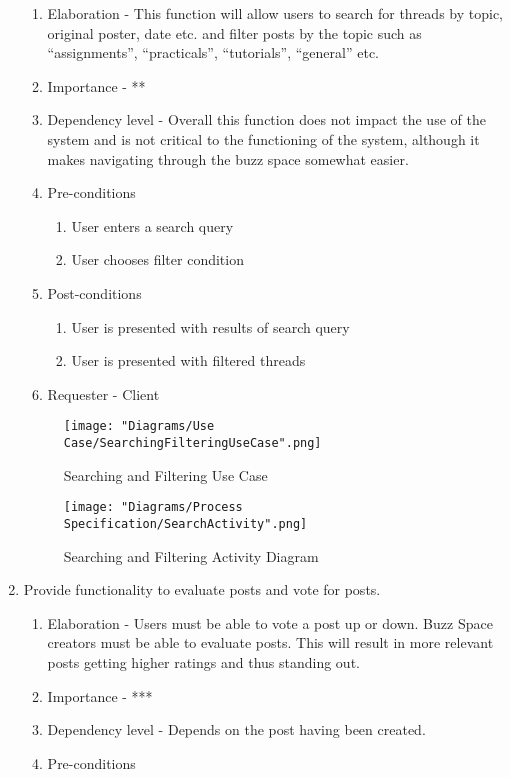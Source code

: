 \documentclass[12pt]{article}
\begin{document}
\begin{enumerate}
\begin{enumerate}
    \item Elaboration - This function will allow users to search for threads by topic, original poster, date etc. and filter posts by the topic such as “assignments”, “practicals”, “tutorials”, “general” etc.
    \item Importance - **
    \item Dependency level - Overall this function does not impact the use of the system and is not critical to the functioning of the system, although it makes navigating through the buzz space somewhat easier.
    \item Pre-conditions
    \begin{enumerate}
    	\item User enters a search query
    	\item User chooses filter condition
    \end{enumerate}
        \item Post-conditions
    \begin{enumerate}
    	\item User is presented with results of search query
    	\item User is presented with filtered threads
    \end{enumerate}
    \item Requester - Client
  \end{enumerate}
  \begin{figure}[h]	
  	\centering
	\texttt{[image: "Diagrams/Use Case/SearchingFilteringUseCase".png]}
	\caption{Searching and Filtering Use Case}
  \end{figure}
  \begin{figure}[h]
  \centering
	\texttt{[image: "Diagrams/Process Specification/SearchActivity".png]}
	\caption{Searching and Filtering Activity Diagram}
  \end{figure}
\clearpage %
   \item  Provide functionality to evaluate posts and vote for posts. %
  \begin{enumerate}
    \item Elaboration - Users must be able to vote a post up or down. Buzz Space creators must be able to evaluate posts. This will result in more relevant posts getting higher ratings and thus standing out.
    \item Importance - ***
    \item Dependency level - Depends on the post having been created.
    \item Pre-conditions

\end{enumerate}
\end{enumerate}
\end{document}
